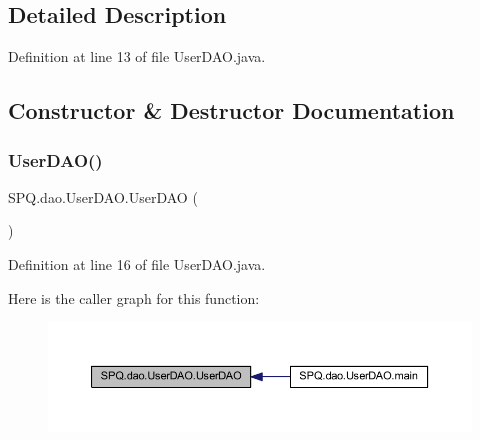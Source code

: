 \subsection{Detailed Description}


Definition at line 13 of file User\+D\+A\+O.\+java.



\subsection{Constructor \& Destructor Documentation}
\mbox{\label{class_s_p_q_1_1dao_1_1_user_d_a_o_ae1c3b0aaf2795cc7d4afec61cce3ec02}} 
\subsubsection{\texorpdfstring{User\+D\+A\+O()}{UserDAO()}\hspace{0.1cm}{\footnotesize\ttfamily [1/4]}}
{\footnotesize\ttfamily S\+P\+Q.\+dao.\+User\+D\+A\+O.\+User\+D\+AO (\begin{DoxyParamCaption}{ }\end{DoxyParamCaption})}



Definition at line 16 of file User\+D\+A\+O.\+java.

Here is the caller graph for this function\+:
\nopagebreak
\begin{figure}[H]
\begin{center}
\leavevmode
\includegraphics[width=350pt]{class_s_p_q_1_1dao_1_1_user_d_a_o_ae1c3b0aaf2795cc7d4afec61cce3ec02_icgraph}
\end{center}
\end{figure}
\mbox{\label{class_s_p_q_1_1dao_1_1_user_d_a_o_ae1c3b0aaf2795cc7d4afec61cce3ec02}} 
